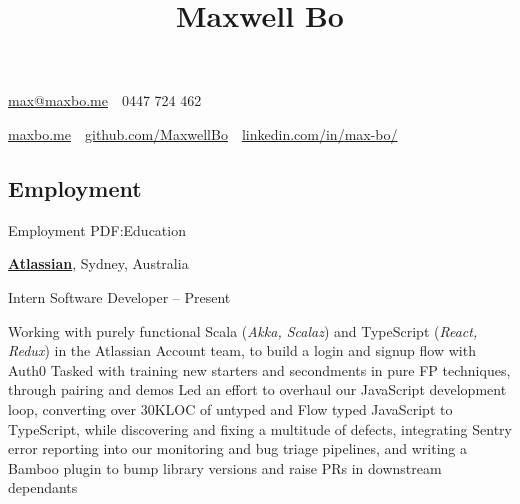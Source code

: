 \documentclass[a4paper,10pt,oneside]{article}
\begin{document}
\begin{minipage}[t][0pt]{\linewidth}


\title{Maxwell Bo}

\begin{subtitle}
\par \href{mailto:max@maxbo.me}{max@maxbo.me} \,\BulletSymbol\, 0447 724 462

\par \href{http://maxbo.me/}{maxbo.me} 
\,\BulletSymbol\, 
\href{https://github.com/MaxwellBo}{github.com/MaxwellBo}
\,\BulletSymbol\, 
\href{https://www.linkedin.com/in/max-bo/}{linkedin.com/in/max-bo/}

\end{subtitle}

\begin{body}


\section
{Employment}
{Employment}
{PDF:Education}

\href{https://www.atlassian.com/}{\textbf{Atlassian}}, Sydney, Australia
\par Intern Software Developer\hfill {} -- Present
\begin{detail}
	\BulletItem Working with purely functional Scala (\textit{Akka, Scalaz}) and TypeScript (\textit{React, Redux}) in the Atlassian Account team, to build a  login and signup flow with Auth0 
	\BulletItem Tasked with training new starters and secondments in pure FP techniques, through pairing and demos
	\BulletItem Led an effort to overhaul our JavaScript development loop, converting over 30KLOC of untyped and Flow typed JavaScript to TypeScript, while discovering and fixing a multitude of defects, integrating Sentry error reporting into our monitoring and bug triage pipelines, and writing a Bamboo plugin to bump library versions and raise PRs in downstream dependants
\end{detail}

\EntryGap


\end{body}
\end{minipage}
\end{document}

